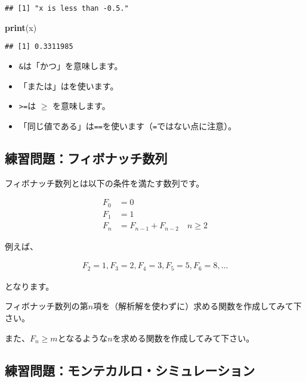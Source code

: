 \documentclass[]{bxjsarticle}
\newenvironment{Shaded}{\begin{snugshade}}{\end{snugshade}}
\newcommand{\KeywordTok}[1]{\textcolor[rgb]{0.13,0.29,0.53}{\textbf{#1}}}
\newcommand{\NormalTok}[1]{#1}
\providecommand{\tightlist}{%
  \setlength{\itemsep}{0pt}\setlength{\parskip}{0pt}}
\begin{document}
\begin{verbatim}
## [1] "x is less than -0.5."
\end{verbatim}

\begin{Shaded}
\begin{Highlighting}[]
\KeywordTok{print}\NormalTok{(x)}
\end{Highlighting}
\end{Shaded}

\begin{verbatim}
## [1] 0.3311985
\end{verbatim}

\begin{itemize}
\tightlist
\item
  \texttt{\&}は「かつ」を意味します。
\item
  「または」は\texttt{\textbar{}}を使います。
\item
  \texttt{\textgreater{}=}は \(\geq\) を意味します。
\item
  「同じ値である」は\texttt{==}を使います（\texttt{=}ではない点に注意）。
\end{itemize}

\hypertarget{ux7df4ux7fd2ux554fux984cux30d5ux30a3ux30dcux30caux30c3ux30c1ux6570ux5217}{%
\subsection{練習問題：フィボナッチ数列}\label{ux7df4ux7fd2ux554fux984cux30d5ux30a3ux30dcux30caux30c3ux30c1ux6570ux5217}}

フィボナッチ数列とは以下の条件を満たす数列です。

\[
\begin{aligned}
  F_0 &= 0 \\
  F_1 &= 1 \\
  F_{n} &= F_{n-1} + F_{n-2} \quad n \geq 2
\end{aligned}
\]

例えば、

\[
\begin{aligned}
  F_2 = 1, F_3 = 2, F_4 = 3, F_5 = 5, F_6 = 8,\ldots
\end{aligned}
\]

となります。

フィボナッチ数列の第\(n\)項を（解析解を使わずに）求める関数を作成してみて下さい。

また、\(F_n \geq m\)となるような\(n\)を求める関数を作成してみて下さい。

\hypertarget{ux7df4ux7fd2ux554fux984cux30e2ux30f3ux30c6ux30abux30ebux30edux30b7ux30dfux30e5ux30ecux30fcux30b7ux30e7ux30f3}{%
\subsection{練習問題：モンテカルロ・シミュレーション}\label{ux7df4ux7fd2ux554fux984cux30e2ux30f3ux30c6ux30abux30ebux30edux30b7ux30dfux30e5ux30ecux30fcux30b7ux30e7ux30f3}}
\end{document}
